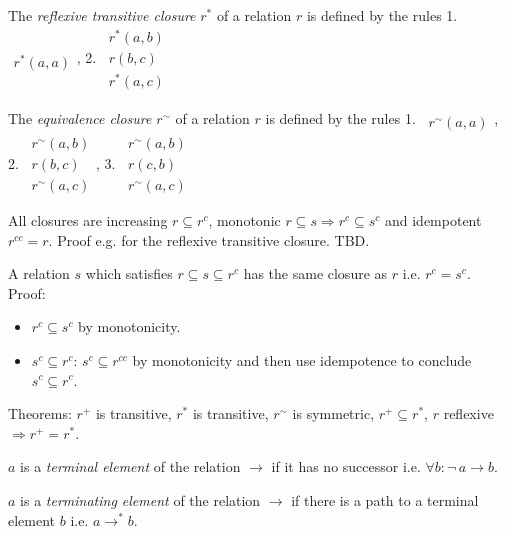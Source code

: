 \documentclass{article}
\def\imp{\Rightarrow}
\newcommand{\rstar}[1]{#1^*}
\newcommand{\rplus}[1]{#1^+}
\newcommand{\reqv}[1]{#1^\sim}
\newcommand{\tostar}{\rstar\to}
\newcommand{\neglow}{\neg\,}
\newcommand{\rulev}[2]{\begin{array}{l} #1 \\ \hline #2\end{array}}
\begin{document}
\begin{definition} The \emph{reflexive transitive closure} $\rstar{r}$ of a relation $r$ is
  defined by the rules
1.~$\rulev{}{\rstar{r}(a,a)}$,
2.~$\rulev{\rstar{r}(a,b) \\ r(b,c)}{\rstar{r}(a,c)}$
\end{definition}

\begin{definition} The \emph{equivalence closure} $\reqv{r}$ of a relation $r$ is
  defined by the rules
  1.~$\rulev{}{\reqv{r}(a,a)}$,
  2.~$\rulev{\reqv{r}(a,b)
    \\ r(b,c)} {\reqv{r}(a,c)}$,
  3.~$\rulev{\reqv{r}(a,b) \\ r(c,b)} {\reqv{r}(a,c)}$
\end{definition}

\begin{theorem}
  All closures are increasing $r \subseteq r^c$, monotonic
  $r \subseteq s \imp r^c \subseteq s^c$ and idempotent $r^{cc} = r$. Proof
  e.g. for the reflexive transitive closure. TBD.
\end{theorem}

\begin{theorem}
A relation $s$ which satisfies $r \subseteq s \subseteq r^c$ has the same closure
as $r$ i.e. $r^c = s^c$. Proof:
  \begin{itemize}
  \item $r^c \subseteq s^c$ by monotonicity.
  \item $s^c \subseteq r^c$: $s^c \subseteq r^{cc}$ by
    monotonicity and then use idempotence to conclude $s^c \subseteq r^c$.
  \end{itemize}
\end{theorem}



Theorems: $\rplus{r}$ is transitive, $\rstar{r}$ is transitive, $\reqv{r}$ is
symmetric, $\rplus{r}\subseteq\rstar{r}$, $r$ reflexive $\imp \rplus{r} =
\rstar{r}$.


\begin{definition}
  $a$ is a \emph{terminal element} of the relation $\to$ if it has no
  successor i.e. $\forall b: \neglow a \to b$.
\end{definition}

\begin{definition}
  $a$ is a \emph{terminating element} of the relation $\to$ if there is a path
  to a terminal element $b$ i.e. $a \tostar b$.
\end{definition}
\end{document}
